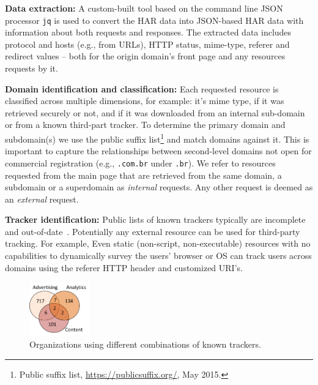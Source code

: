 \documentclass[letterpaper]{sig-alternate-10pt}
\begin{document}

{\bf Data extraction:}
A custom-built tool based on the command line JSON processor \texttt{jq}
is used to convert the HAR data into JSON-based HAR data with information about both requests and responses.
The extracted data includes protocol and hosts (e.g., from URLs), 
HTTP status, mime-type, referer and redirect values – both
for the origin domain's front page and any resources requests by it. 

{\bf Domain identification and classification:}
Each requested resource is classified across multiple dimensions, for example: 
it's mime type, if it was retrieved securely or not, and if it was downloaded 
from an internal sub-domain or from a known third-part tracker. 
To determine the primary domain and subdomain(s) we use the 
public suffix list\footnote{Public suffix list, \url{https://publicsuffix.org/}, May 2015.} 
and match domains against it.  This is important to capture the relationships
between second-level domains not open for commercial registration (e.g., \texttt{.com.br} under \texttt{.br}).  
We refer to resources requested from the main page
that are retrieved from the same domain, a subdomain
or a superdomain as {\em internal} requests.
Any other request is deemed as an {\em external} request.

{\bf Tracker identification:}
Public lists of known trackers typically are incomplete and out-of-date~\cite{MPS+13, KrWi06}.
Potentially any external resource can be used for third-party tracking.
For example, 
Even static (non-script, non-executable) resources with no capabilities to
dynamically survey the users' browser or OS can track users across domains using
the referer HTTP header and customized URI's.

\begin{figure}[t]
\centering
\includegraphics[width=0.23\textwidth]{venn-v00.pdf}
\vspace{-18pt}
\caption{Organizations using
different combinations of known trackers.}
\label{fig:venn}
\vspace{-16pt}
\end{figure}
\end{document}

